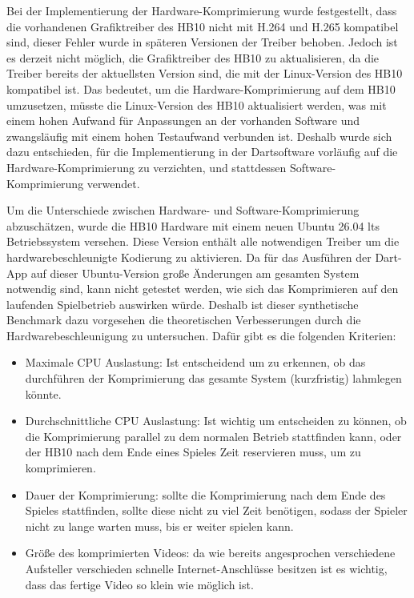 Bei der Implementierung der Hardware-Komprimierung wurde festgestellt, dass die vorhandenen Grafiktreiber des HB10 nicht mit H.264 und H.265 kompatibel sind, dieser Fehler wurde in späteren Versionen der Treiber behoben. Jedoch ist es derzeit nicht möglich,
die Grafiktreiber des HB10 zu aktualisieren, da die Treiber bereits der aktuellsten Version sind, die mit der Linux-Version des HB10 kompatibel ist. Das bedeutet, um die Hardware-Komprimierung auf dem HB10 umzusetzen, müsste die Linux-Version des HB10 aktualisiert werden,
was mit einem hohen Aufwand für Anpassungen an der vorhanden Software und zwangsläufig mit einem hohen Testaufwand verbunden ist. Deshalb wurde sich dazu entschieden, für die Implementierung in der Dartsoftware vorläufig auf die Hardware-Komprimierung zu verzichten, und stattdessen Software-Komprimierung
verwendet.

Um die Unterschiede zwischen Hardware- und Software-Komprimierung abzuschätzen, wurde die HB10 Hardware mit einem neuen Ubuntu 26.04 lts Betriebssystem versehen. Diese Version enthält alle notwendigen Treiber um die hardwarebeschleunigte Kodierung zu aktivieren. 
Da für das Ausführen der Dart-App auf dieser Ubuntu-Version große Änderungen am gesamten System notwendig sind, kann nicht getestet werden, wie sich das Komprimieren auf den laufenden Spielbetrieb auswirken würde. 
Deshalb ist dieser synthetische Benchmark dazu vorgesehen die theoretischen Verbesserungen durch die Hardwarebeschleunigung zu untersuchen. Dafür gibt es die folgenden Kriterien:
\begin{itemize}
    \item Maximale CPU Auslastung: Ist entscheidend um zu erkennen, ob das durchführen der Komprimierung das gesamte System (kurzfristig) lahmlegen könnte.
    \item Durchschnittliche CPU Auslastung: Ist wichtig um entscheiden zu können, ob die Komprimierung parallel zu dem normalen Betrieb stattfinden kann, oder der HB10 nach dem Ende eines Spieles Zeit reservieren muss, um zu komprimieren.
    \item Dauer der Komprimierung: sollte die Komprimierung nach dem Ende des Spieles stattfinden, sollte diese nicht zu viel Zeit benötigen, sodass der Spieler nicht zu lange warten muss, bis er weiter spielen kann.
    \item Größe des komprimierten Videos: da wie bereits angesprochen verschiedene Aufsteller verschieden schnelle Internet-Anschlüsse besitzen ist es wichtig, dass das fertige Video so klein wie möglich ist.  
\end{itemize}

